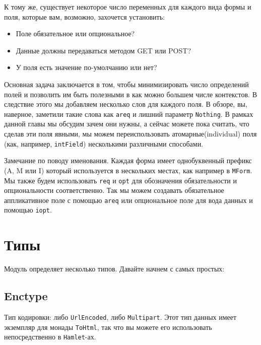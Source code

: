 К тому же, существует некоторое число переменных для каждого вида формы и поля,
которые вам, возможно, захочется установить:
\begin{itemize}
\item Поле обязательное или опциональное?
\item Данные должны передаваться методом GET или POST?
\item У поля есть значение по-умолчанию или нет?
\end{itemize}

Основная задача заключается в том, чтобы минимизировать число определений полей и
позволить
им быть полезными в как можно большем числе контекстов. В следствие этого мы добавляем
несколько слов для каждого поля. В обзоре, вы, наверное, заметили такие слова как
\lstinline'areq' и лишний параметр \lstinline'Nothing'. В рамках данной главы мы обсудим 
зачем они нужны, а сейчас можете пока считать, что сделав эти поля явными, мы можем
переиспользовать атомарные(individual) поля (как, например, 
{\lstinline'intField'}) несколькими различными способами.

Замечание по поводу именования. Каждая форма имеет однобуквенный префикс (A, M или I)
который используется в нескольких местах, как например в \lstinline'MForm'. Мы также
будем использовать \lstinline'req' и \lstinline'opt' для обозначения обязательности и
опциональности соответственно. Так мы можем создавать обязательное аппликативное поле с
помощью \lstinline'areq' или опциональное поле для вода данных и помощью \lstinline'iopt'.

\section{Типы}

Модуль  
определяет несколько типов. Давайте начнем с самых простых:

\subsection{Enctype}
Тип кодировки: либо \lstinline'UrlEncoded', либо \lstinline'Multipart'. Этот тип данных
имеет экземпляр для монады \lstinline'ToHtml', так что вы можете его использовать
непосредственно в \lstinline'Hamlet'-ах.

